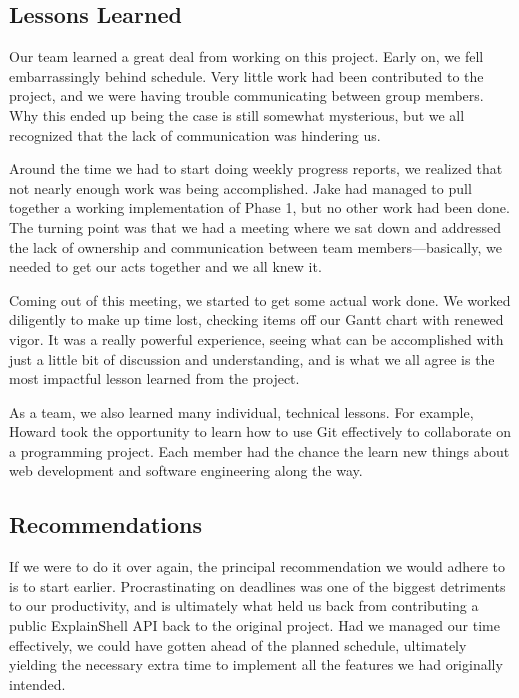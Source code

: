 \documentclass[11pt]{article}
\begin{document}
\subsection{Lessons Learned}

Our team learned a great deal from working on this project. Early on, we fell
embarrassingly behind schedule. Very little work had been contributed to the
project, and we were having trouble communicating between group members. Why
this ended up being the case is still somewhat mysterious, but we all recognized
that the lack of communication was hindering us.

Around the time we had to start doing weekly progress reports, we realized that
not nearly enough work was being accomplished. Jake had managed to pull together
a working implementation of Phase 1, but no other work had been done. The
turning point was that we had a meeting where we sat down and addressed the
lack of ownership and communication between team members---basically, we needed
to get our acts together and we all knew it.

Coming out of this meeting, we started to get some actual work done. We worked
diligently to make up time lost, checking items off our Gantt chart with renewed
vigor. It was a really powerful experience, seeing what can be accomplished with
just a little bit of discussion and understanding, and is what we all agree is
the most impactful lesson learned from the project.

As a team, we also learned many individual, technical lessons. For example,
Howard took the opportunity to learn how to use Git effectively to
collaborate on a programming project. Each member had the chance the learn new
things about web development and software engineering along the way.

\subsection{Recommendations}

If we were to do it over again, the principal recommendation we would adhere to
is to start earlier. Procrastinating on deadlines was one of the biggest
detriments to our productivity, and is ultimately what held us back from
contributing a public ExplainShell API back to the original project. Had we
managed our time effectively, we could have gotten ahead of the planned
schedule, ultimately yielding the necessary extra time to implement all the
features we had originally intended.
\end{document}
